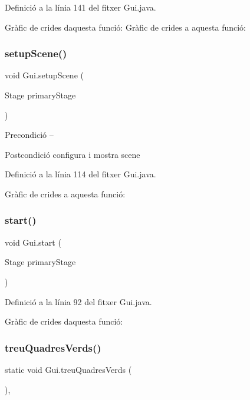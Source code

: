 Definició a la línia 141 del fitxer Gui.\+java.

Gràfic de crides d\textquotesingle{}aquesta funció\+:
Gràfic de crides a aquesta funció\+:
\mbox{\label{class_gui_a5d68899327d6f647d058ccc57b78634d}} 
\subsubsection{\texorpdfstring{setup\+Scene()}{setupScene()}}
{\footnotesize\ttfamily void Gui.\+setup\+Scene (\begin{DoxyParamCaption}\item[{Stage}]{primary\+Stage }\end{DoxyParamCaption})\hspace{0.3cm}{\ttfamily [private]}}

\begin{DoxyPrecond}{Precondició}
-- 
\end{DoxyPrecond}
\begin{DoxyPostcond}{Postcondició}
configura i mostra scene 
\end{DoxyPostcond}


Definició a la línia 114 del fitxer Gui.\+java.

Gràfic de crides a aquesta funció\+:
\mbox{\label{class_gui_a7997885cf723f790c4ec5b2328407023}} 
\subsubsection{\texorpdfstring{start()}{start()}}
{\footnotesize\ttfamily void Gui.\+start (\begin{DoxyParamCaption}\item[{Stage}]{primary\+Stage }\end{DoxyParamCaption})}



Definició a la línia 92 del fitxer Gui.\+java.

Gràfic de crides d\textquotesingle{}aquesta funció\+:
\mbox{\label{class_gui_a6364d40f472084c5d50859159b8c46d4}} 
\subsubsection{\texorpdfstring{treu\+Quadres\+Verds()}{treuQuadresVerds()}}
{\footnotesize\ttfamily static void Gui.\+treu\+Quadres\+Verds (\begin{DoxyParamCaption}{ }\end{DoxyParamCaption})\hspace{0.3cm}{\ttfamily [static]}, {\ttfamily [private]}}

